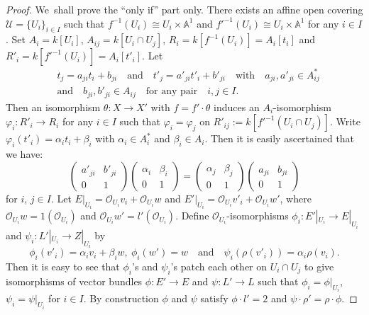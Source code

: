 \begin{proof}
We\pageoriginale\ shall prove the ``only if'' part only. There exists
an affine open covering $\mathscr{U}=\{U_{i}\}_{i\in I}$ such that
$f^{-1}(U_{i})\cong U_{i}\times \mathbb{A}^{1}$ and
${f'}^{-1}(U_{i})\cong U_{i}\times\mathbb{A}^{1}$ for any $i\in
I$. Set $A_{i}=k[U_{i}]$, $A_{ij}=k[U_{i}\cap U_{j}]$,
$R_{i}=k[f^{-1}(U_{i})]=A_{i}[t_{i}]$ and
$R'_{i}=k[{f'}^{-1}(U_{i})]=A_{i}[t'_{i}]$. Let 
\begin{align*}
& t_{j}=a_{ji}t_{i}+b_{ji}\quad\text{and}\quad
  t'_{j}=a'_{ji}t'_{i}+b'_{ji}\quad\text{with}\quad a_{ji}, a'_{ji}\in
  A^{\ast}_{ij}\\
& \text{and}\quad b_{ji}, b'_{ji}\in A_{ij}\quad\text{for any
    pair}\quad i, j\in I.
\end{align*}
Then an isomorphism $\theta:X\to X'$ with $f=f'\cdot\theta$ induces an
$A_{i}$-isomorphism $\varphi_{i}:R'_{i}\to R_{i}$ for any $i\in I$
such that $\varphi_{i}=\varphi_{j}$ on $R'_{ij}:=k[{f'}^{-1}(U_{i}\cap
  U_{j})]$. Write $\varphi_{i}(t'_{i})=\alpha_{i}t_{i}+\beta_{i}$ with
$\alpha_{i}\in A^{\ast}_{i}$ and $\beta_{i}\in A_{i}$. Then it is
easily ascertained that we have:
$$
\begin{pmatrix}
a'_{ji} & b'_{ji}\\
0 & 1
\end{pmatrix}
\begin{pmatrix}
\alpha_{i} & \beta_{i}\\
0 & 1
\end{pmatrix}
=
\begin{pmatrix}
\alpha_{j} & \beta_{j}\\
0 & 1
\end{pmatrix}
\begin{pmatrix}
a_{ji} & b_{ji}\\
0 & 1
\end{pmatrix}
$$
for $i$, $j\in I$. Let
$E|_{U_{i}}=\mathscr{O}_{U_{i}}v_{i}+\mathscr{O}_{U_{i}}w$ and
$E'|_{U_{i}}=\mathscr{O}_{U_{i}}v'_{i}+\mathscr{O}_{U_{i}}w'$, where
$\mathscr{O}_{U_{i}}w=1(\mathscr{O}_{U_{i}})$ and
$\mathscr{O}_{U_{i}}w'=l'(\mathscr{O}_{U_{i}})$. Define
$\mathscr{O}_{U_{i}}$-isomorphisms $\phi_{i}:E'|_{U_{i}}\to
E|_{U_{i}}$ and $\psi_{i}:L'|_{U_{i}}\to Z|_{U_{i}}$ by
$$
\phi_{i}(v'_{i})=\alpha_{i}v_{i}+\beta_{i}w,~
\phi_{i}(w')=w\quad\text{and}\quad
\psi_{i}(\rho(v'_{i}))=\alpha_{i}\rho(v_{i}). 
$$
Then it is easy to see that $\phi_{i}$'s and $\psi_{i}$'s patch each
other on $U_{i}\cap U_{j}$ to give isomorphisms of vector bundles
$\phi:E'\to E$ and $\psi:L'\to L$ such that $\phi_{i}=\phi|_{U_{i}}$,
$\psi_{i}=\psi|_{U_{i}}$ for $i\in I$. By construction $\phi$ and
$\psi$ satisfy $\phi\cdot l'=2$ and $\psi\cdot
\rho'=\rho\cdot\phi$.
\end{proof}

